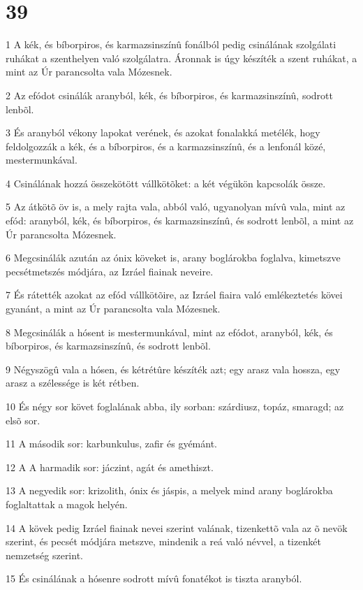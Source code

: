 \chapter{39}

\par 1 A kék, és bíborpiros, és karmazsinszínû fonálból pedig csinálának szolgálati ruhákat a szenthelyen való szolgálatra. Áronnak is úgy készíték a szent ruhákat, a mint az Úr parancsolta vala Mózesnek.
\par 2 Az efódot csinálák aranyból, kék, és bíborpiros, és karmazsinszínû, sodrott lenbõl.
\par 3 És aranyból vékony lapokat verének, és azokat fonalakká metélék, hogy feldolgozzák a kék, és a bíborpiros, és a karmazsinszínû, és a lenfonál közé, mestermunkával.
\par 4 Csinálának hozzá összekötött vállkötõket: a két végükön kapcsolák össze.
\par 5 Az átkötõ öv is, a mely rajta vala, abból való, ugyanolyan mívû vala, mint az efód: aranyból, kék, és bíborpiros, és karmazsinszínû, és sodrott lenbõl, a mint az Úr parancsolta Mózesnek.
\par 6 Megcsinálák azután az ónix köveket is, arany boglárokba foglalva, kimetszve pecsétmetszés módjára, az Izráel fiainak neveire.
\par 7 És rátették azokat az efód vállkötõire, az Izráel fiaira való emlékeztetés kövei gyanánt, a mint az Úr parancsolta vala Mózesnek.
\par 8 Megcsinálák a hósent is mestermunkával, mint az efódot, aranyból, kék, és bíborpiros, és karmazsinszínû, és sodrott lenbõl.
\par 9 Négyszögû vala a hósen, és kétrétûre készíték azt; egy arasz vala hossza, egy arasz a szélessége is két rétben.
\par 10 És négy sor követ foglalának abba, ily sorban: szárdiusz, topáz, smaragd; az elsõ sor.
\par 11 A második sor: karbunkulus, zafir és gyémánt.
\par 12 A A harmadik sor: jáczint, agát és amethiszt.
\par 13 A negyedik sor: krizolith, ónix és jáspis, a melyek mind arany boglárokba foglaltattak a magok helyén.
\par 14 A kövek pedig Izráel fiainak nevei szerint valának, tizenkettõ vala az õ nevök szerint, és pecsét módjára metszve, mindenik a reá való névvel, a tizenkét nemzetség szerint.
\par 15 És csinálának a hósenre sodrott mívû fonatékot is tiszta aranyból.
